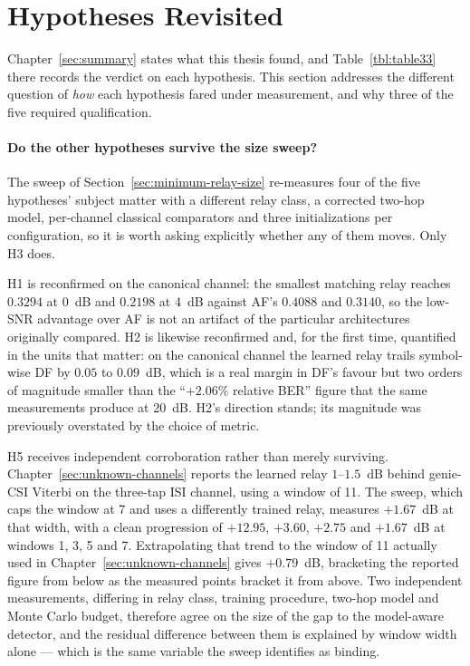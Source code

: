 \section{Hypotheses Revisited}\label{sec:conclusions}

Chapter~\ref{sec:summary} states what this thesis found, and Table~\ref{tbl:table33} there records the verdict on each hypothesis. This section addresses the different question of \emph{how} each hypothesis fared under measurement, and why three of the five required qualification.

\paragraph{Do the other hypotheses survive the size sweep?} The sweep of Section~\ref{sec:minimum-relay-size} re-measures four of the five hypotheses' subject matter with a different relay class, a corrected two-hop model, per-channel classical comparators and three initializations per configuration, so it is worth asking explicitly whether any of them moves. Only H3 does.

H1 is reconfirmed on the canonical channel: the smallest matching relay reaches $0.3294$ at 0~dB and $0.2198$ at 4~dB against AF's $0.4088$ and $0.3140$, so the low-SNR advantage over AF is not an artifact of the particular architectures originally compared. H2 is likewise reconfirmed and, for the first time, quantified in the units that matter: on the canonical channel the learned relay trails symbol-wise DF by $0.05$ to $0.09$~dB, which is a real margin in DF's favour but two orders of magnitude smaller than the ``$+2.06\%$ relative BER'' figure that the same measurements produce at 20~dB. H2's direction stands; its magnitude was previously overstated by the choice of metric.

H5 receives independent corroboration rather than merely surviving. Chapter~\ref{sec:unknown-channels} reports the learned relay $1$--$1.5$~dB behind genie-CSI Viterbi on the three-tap ISI channel, using a window of 11. The sweep, which caps the window at 7 and uses a differently trained relay, measures $+1.67$~dB at that width, with a clean progression of $+12.95$, $+3.60$, $+2.75$ and $+1.67$~dB at windows 1, 3, 5 and 7. Extrapolating that trend to the window of 11 actually used in Chapter~\ref{sec:unknown-channels} gives $+0.79$~dB, bracketing the reported figure from below as the measured points bracket it from above. Two independent measurements, differing in relay class, training procedure, two-hop model and Monte Carlo budget, therefore agree on the size of the gap to the model-aware detector, and the residual difference between them is explained by window width alone --- which is the same variable the sweep identifies as binding.

